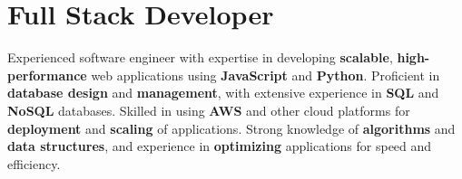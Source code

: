 
\section{Full Stack Developer}
\small{
    Experienced software engineer with expertise in developing \textbf{scalable}, \textbf{high-performance} web applications using \textbf{JavaScript} and \textbf{Python}. Proficient in \textbf{database design} and \textbf{management}, with extensive experience in \textbf{SQL} and \textbf{NoSQL} databases. Skilled in using \textbf{AWS} and other cloud platforms for \textbf{deployment} and \textbf{scaling} of applications. Strong knowledge of \textbf{algorithms} and \textbf{data structures}, and experience in \textbf{optimizing} applications for speed and efficiency.
}